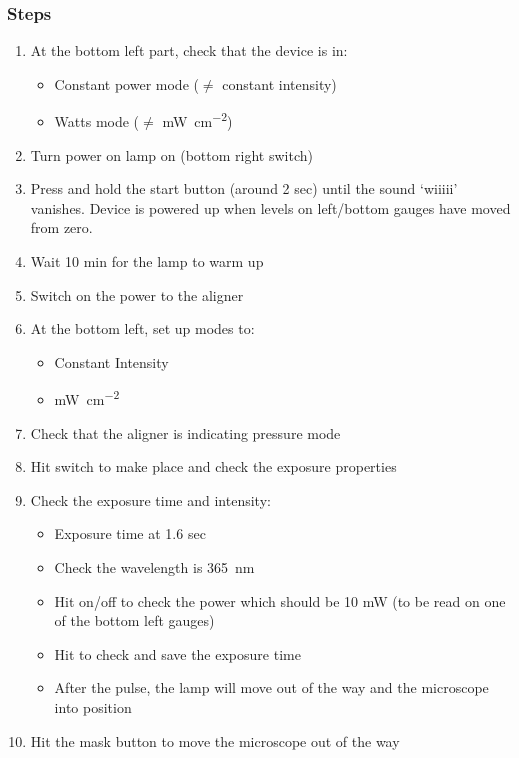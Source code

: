 \subsubsection{Steps}
\begin{enumerate}
\item At the bottom left part, check that the device is in:
\begin{itemize}[nolistsep, noitemsep]
\item Constant power mode ($\neq$ constant intensity)
\item Watts mode ($\neq$ \si{\milli\watt\per\square\centi\meter})
\end{itemize}
\item Turn power on lamp on (bottom right switch)
\item Press and hold the start button (around 2 sec) until the sound `wiiiii' vanishes.
Device is powered up when levels on left/bottom gauges have moved from zero.
\item Wait 10 min for the lamp to warm up
\item Switch on the power to the aligner
\item At the bottom left, set up modes to:
\begin{itemize}[nolistsep, noitemsep]
  \item Constant Intensity
  \item \si{\milli\watt\per\square\centi\meter}
\end{itemize}
\item Check that the aligner is indicating pressure mode
\item Hit  switch to make place and check the exposure properties
\item Check the exposure time and intensity:
\begin{itemize}[nolistsep, noitemsep]
  \item Exposure time at 1.6 sec
  \item Check the wavelength is \SI{365}{\nano\meter}
  \item Hit  on/off to check the power which should be 10 mW (to be read on one of the bottom left gauges)
  \item Hit  to check and save the exposure time
  \item After the pulse, the lamp will move out of the way and the microscope into position
\end{itemize}
\item Hit the mask  button to move the microscope out of the way

\end{enumerate}
